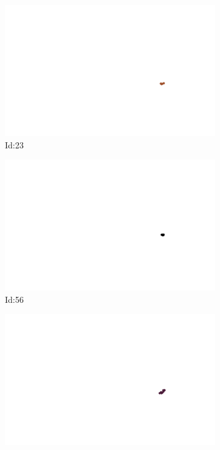 \documentclass[12pt,twoside]{report}
\begin{document}
\begin{figure}
\centering
\begin{subfigure}[b]{0.20\textwidth}
\centering
\includegraphics[width=\textwidth]{../../trajectories/23.png}
\caption{Id:23}
\end{subfigure}
\begin{subfigure}[b]{0.20\textwidth}
\centering
\includegraphics[width=\textwidth]{../../trajectories/56.png}
\caption{Id:56}
\end{subfigure}
\begin{subfigure}[b]{0.20\textwidth}
\centering
\includegraphics[width=\textwidth]{../../trajectories/267.png}

\end{subfigure}
\end{figure}
\end{document}
